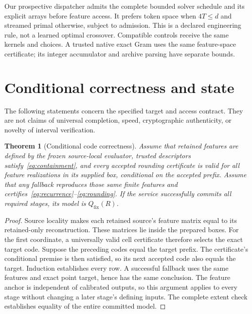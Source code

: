 \documentclass[10pt,twocolumn,letterpaper]{article}
\newtheorem{theorem}{Theorem}
\newcommand{\Qfix}{Q_{\mathrm{fix}}}
\begin{document}
Our prospective dispatcher admits the complete bounded solver schedule and its
explicit arrays before feature access. It prefers token space when $4T\leq d$
and streamed primal otherwise, subject to admission. This is a declared
engineering rule, not a learned optimal crossover. Compatible controls receive
the same kernels and choices. A trusted native exact Gram uses the same
feature-space certificate; its integer accumulator and archive parsing have
separate bounds.

\section{Conditional correctness and state}
The following statements concern the specified target and access contract. They
are not claims of universal completion, speed, cryptographic authenticity, or
novelty of interval verification.

\begin{theorem}[Conditional code correctness]
\label{thm:codes}
Assume that retained features are defined by the frozen source-local evaluator,
trusted descriptors satisfy~\eqref{eq:containment}, and every accepted rounding
certificate is valid for all feature realizations in its supplied box, conditional
on the accepted prefix. Assume that any fallback reproduces those same finite
features and certifies~\eqref{eq:recurrence}--\eqref{eq:rounding}. If the service
successfully commits all required stages, its model is $\Qfix(R)$.
\end{theorem}
\begin{proof}
Source locality makes each retained source's feature matrix equal to its
retained-only reconstruction. These matrices lie inside the prepared boxes.
For the first coordinate, a universally valid cell certificate therefore selects
the exact target code. Suppose the preceding codes equal the target prefix. The
certificate's conditional premise is then satisfied, so its next accepted code
also equals the target. Induction establishes every row. A successful fallback
uses the same features and exact point target, hence has the same conclusion.
The feature anchor is independent of calibrated outputs, so this argument applies
to every stage without changing a later stage's defining inputs. The complete
extent check establishes equality of the entire committed model.
\end{proof}
\end{document}
